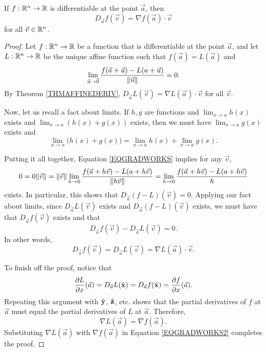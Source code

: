 \begin{theorem}
	\label{THMDIFFERENTIABLE}
	If $f:\mathbb{R}^n\to\mathbb{R}$ is differentiable at the point $\vec a$, then
	\[
		D_{\vec a}f(\vec v)=\nabla f(\vec a)\cdot \vec v
	\]
	for all $\vec v\in\mathbb{R}^n$.
\end{theorem}
\begin{proof}
	Let $f:\mathbb{R}^n\to\mathbb{R}$ be a function that is differentiable at
	the point $\vec a$, and let $L:\mathbb{R}^n\to\mathbb{R}$ be the unique affine function
	such that $f(\vec a)=L(\vec a)$ and 
	\begin{equation}
		\label{EQGRADWORKS}
		\lim_{\vec u\to\vec 0}
		\frac{f(\vec a+\vec u)-L(a+\vec u)}{\lVert\vec u\rVert}=0.
	\end{equation}
	By Theorem \ref{THMAFFINEDERIV}, $D_{\vec a}L(\vec v)=\nabla L(\vec a)\cdot \vec v$
	for all $\vec v$.

	Now, let us recall a fact about limits. If $h,g$ are functions and
	$\lim_{x\to a}h(x)$ exists and $\lim_{x\to a}(h(x)+g(x))$ exists, then
	we must have $\lim_{x\to a}g(x)$ exists and
	\[
		\lim_{x\to a} \Big(h(x)+g(x)\Big)=
		\lim_{x\to a} h(x)+\lim_{x\to a}g(x).
	\]
	
	Putting it all together, Equation \eqref{EQGRADWORKS} implies
	for any $\vec v$,
	\[
		0=0\lVert\vec v\rVert=\lVert\vec v\rVert\lim_{h\to 0} 
		\frac{f(\vec a+h\vec v)-L(a+h\vec v)}{\lVert h\vec v\rVert}
		=
		\lim_{h\to 0} 
		\frac{f(\vec a+h\vec v)-L(a+h\vec v)}{h}
	\]
	exists.  In particular, this shows that $D_{\vec a}(f-L)(\vec v)=0$.
	Applying our fact about limits, since $D_{\vec a}L(\vec v)$ exists
	and $D_{\vec a}(f-L)(\vec v)$ exists, we must have that $D_{\vec a}f(\vec v)$
	exists and that
	\[
		D_{\vec a}f(\vec v) - D_{\vec a}L(\vec v)=0.
	\]
	In other words,
	\begin{equation}
		\label{EQGRADWORKS2}
		D_{\vec a}f(\vec v) = D_{\vec a}L(\vec v) = \nabla L(\vec a)\cdot \vec v.
	\end{equation}

	To finish off the proof, notice that
	\[
		\frac{\partial L}{\partial x}(\vec a)=
		D_{\vec a}L({\hat {\mathbf x}}) = D_{\vec a}f({\hat {\mathbf x}})=\frac{\partial f}{\partial x}(\vec a).
	\]
	Repeating this argument with ${\hat {\mathbf y}}$,
	${\hat {\mathbf z}}$, etc\mbox{.} shows that the partial derivatives of $f$ at $\vec a$
	must equal the partial derivatives of $L$ at $\vec a$.  Therefore,
	\[
		\nabla L(\vec a)=\nabla f(\vec a).
	\]
	Substituting $\nabla L(\vec a)$ with $\nabla f(\vec a)$ in Equation
	\eqref{EQGRADWORKS2} completes the proof.
\end{proof}

